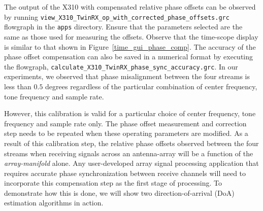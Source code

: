 \documentclass[a4paper, 11pt]{article}
\begin{document}
The output of the X310 with compensated relative phase offsets can be observed by running \texttt{view\_X310\_TwinRX\_op\_with\_corrected\_phase\_offsets.grc} flowgraph in the \texttt{apps} directory. Ensure that the parameters selected are the same as those used for measuring the offsets. Observe that the time-scope display is similar to that shown in Figure~\ref{time_gui_phase_comp}. The accuracy of the phase offset compensation can also be saved in a numerical format by executing the flowgraph, \texttt{calculate\_X310\_TwinRX\_phase\_sync\_accuracy.grc}. In our experiments, we observed that phase misalignment between the four streams is less than $0.5$ degrees regardless of the particular combination of center frequency, tone frequency and sample rate. 

However, this calibration is valid for a particular choice of center frequency, tone frequency and sample rate only. The phase offset measurement and correction step needs to be repeated when these operating parameters are modified. As a result of this calibration step, the relative phase offsets observed between the four streams when receiving signals across an antenna-array will be a function of the \textit{array-manifold} alone. Any user-developed array signal processing application that requires accurate phase synchronization between receive channels will need to incorporate this compensation step as the first stage of processing. To demonstrate how this is done, we will show two direction-of-arrival (DoA) estimation algorithms in action. 
\end{document}
